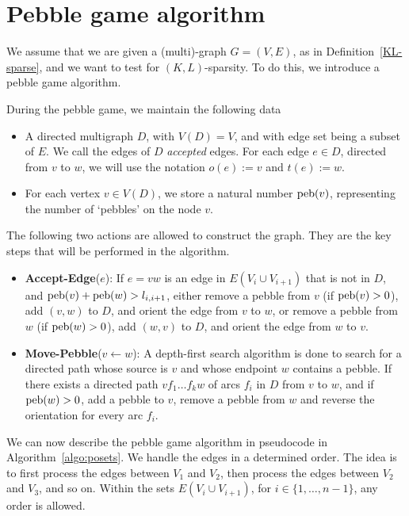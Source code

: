 \documentclass[10pt,a4paper]{article}
\newcommand{\peb}{\textup{peb}}
\newcommand{\AcceptEdge}[1]{\textbf{Accept-Edge}(#1)}
\newcommand{\MovePebble}[1]{\textbf{Move-Pebble}(#1)}
\begin{document}
\section{Pebble game algorithm}\label{sec:Algorithm}
We assume that we are given a (multi)-graph $G=(V,E)$, as in Definition~\ref{KL-sparse}, and we want to test for $(K,L)$-sparsity. To do this, we introduce a pebble game algorithm.

During the pebble game, we maintain the following data
\begin{itemize}
\item A directed multigraph $D$, with $V(D)=V$, and with edge set being a subset of $E$. We call the edges of $D$ \emph{accepted} edges. For each edge $e\in D$, directed from $v$ to $w$, we will use the notation $o(e) := v$ and $t(e):=w$.
\item For each vertex $v\in V(D)$, we store a natural number $\peb(v)$, representing the number of `pebbles' on the node $v$.
\end{itemize}
The following two actions are allowed to construct the graph. They are the key steps that will be performed in the algorithm.
\begin{itemize}
\item{\AcceptEdge{$e$}: If $e=vw$ is an edge in $E(V_i \cup V_{i+1})$ that is not in $D$, and $\peb(v)+\peb(w)>l_{i,i+1}$, either
remove a pebble from $v$ (if $\peb(v) > 0$), add $(v,w)$ to $D$, and orient the edge from $v$ to $w$, or remove a pebble from $w$ (if $\peb(w) > 0$), add $(w,v)$ to $D$, and orient the edge from $w$ to $v$.} 
\item{\MovePebble{$v\leftarrow w$}: A depth-first search algorithm is done to search for a directed path whose source is $v$ and whose endpoint $w$ contains a pebble. If there exists a directed path $vf_1\dots f_kw$ of arcs $f_i$ in $D$ from $v$ to $w$, and if $\peb(w)>0$,  add a pebble to $v$, remove a pebble from $w$ and reverse the orientation for every arc $f_i$.}

\end{itemize}

We can now describe the pebble game algorithm in pseudocode in Algorithm~\ref{algo:posets}. We handle the edges in a determined order. The idea is to first process the edges between $V_1$ and $V_2$, then process the edges between $V_2$ and $V_3$, and so on. Within the sets $E(V_{i}\cup V_{i+1})$, for $i \in \{1, \dots, n-1\}$, any order is allowed.
\end{document}
